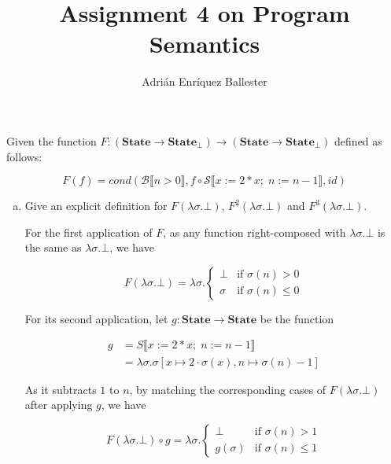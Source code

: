 \documentclass{article}
\title{Assignment 4 on Program Semantics}
\author{Adrián Enríquez Ballester}
\begin{document}
\maketitle

Given the function $F: 
  \left(
    \textbf{State} \rightarrow \textbf{State}_\bot
  \right) 
  \rightarrow 
  \left(
    \textbf{State} \rightarrow \textbf{State}_\bot
  \right)
$ defined as follows:

$$
F(f) = cond
  \left(
    \mathcal{B}\llbracket n > 0\rrbracket,
    f \circ \mathcal{S} 
      \llbracket 
        x := 2 * x; \; n := n - 1
      \rrbracket,
    id
  \right)
$$

\begin{enumerate}[(a)]
  \item Give an explicit definition for 
    $F\left(\lambda\sigma.\bot\right)$,
    $F^2\left(\lambda\sigma.\bot\right)$
    and $F^3\left(\lambda\sigma.\bot\right)$.

    For the first application of $F$, as any function 
    right-composed with $\lambda\sigma.\bot$ is the same
    as $\lambda\sigma.\bot$, we have

    $$F\left(\lambda\sigma.\bot\right) 
      = \lambda\sigma.\begin{cases}
        \bot & \text{if } \sigma(n) > 0 \\
        \sigma & \text{if } \sigma(n) \leq 0
      \end{cases}
    $$

    For its second application,
    let $g: \textbf{State} \rightarrow \textbf{State}$ 
    be the function 

    \begin{align*}
      g &= S
      \llbracket
        x := 2 * x; \; n := n - 1 
      \rrbracket \\ &=
      \lambda \sigma. \sigma
        \left[
          x \mapsto 2 \cdot \sigma(x),
          n \mapsto \sigma(n) - 1
        \right]
    \end{align*}

    As it subtracts $1$ to $n$, by matching the 
    corresponding cases of $F(\lambda\sigma.\bot)$ 
    after applying $g$, 
    we have

    $$F(\lambda\sigma.\bot) \circ g =
      \lambda\sigma. \begin{cases}
        \bot & \text{if } \sigma(n) > 1 \\ 
        g(\sigma) & \text{if } \sigma(n) \leq 1
      \end{cases}
    $$


\end{enumerate}
\end{document}
